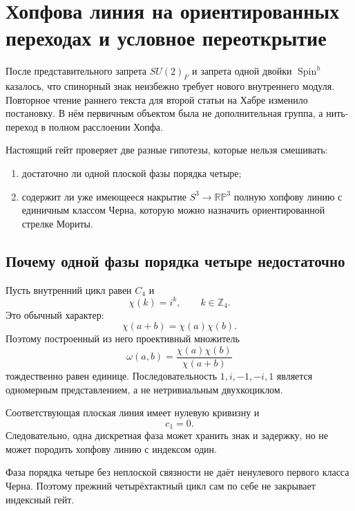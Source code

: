 \chapter{Хопфова линия на ориентированных переходах и условное переоткрытие}

После представительного запрета $SU(2)_F$ и запрета одной двойки
$\operatorname{Spin}^h$ казалось, что спинорный знак неизбежно требует
нового внутреннего модуля. Повторное чтение раннего текста для второй
статьи на Хабре изменило постановку. В нём первичным объектом была не
дополнительная группа, а нить-переход в полном расслоении Хопфа.

Настоящий гейт проверяет две разные гипотезы, которые нельзя смешивать:
\begin{enumerate}
 \item достаточно ли одной плоской фазы порядка четыре;
 \item содержит ли уже имеющееся накрытие $S^3\to\mathbb{RP}^3$ полную
 хопфову линию с единичным классом Черна, которую можно назначить
 ориентированной стрелке Мориты.
\end{enumerate}

\section{Почему одной фазы порядка четыре недостаточно}

Пусть внутренний цикл равен $C_4$ и
\begin{equation}
 \chi(k)=i^k,
 \qquad k\in\mathbb Z_4.
\end{equation}
Это обычный характер:
\begin{equation}
 \chi(a+b)=\chi(a)\chi(b).
\end{equation}
Поэтому построенный из него проективный множитель
\begin{equation}
 \omega(a,b)=\frac{\chi(a)\chi(b)}{\chi(a+b)}
\end{equation}
тождественно равен единице. Последовательность
$1,i,-1,-i,1$ является одномерным представлением, а не нетривиальным
двухкоциклом.

Соответствующая плоская линия имеет нулевую кривизну и
\begin{equation}
 c_1=0.
\end{equation}
Следовательно, одна дискретная фаза может хранить знак и задержку, но не
может породить хопфову линию с индексом один.

\begin{nogocriterion}
Фаза порядка четыре без неплоской связности не даёт ненулевого первого
класса Черна. Поэтому прежний четырёхтактный цикл сам по себе не закрывает
индексный гейт.
\end{nogocriterion}

